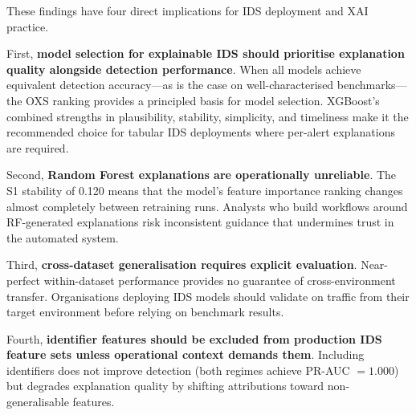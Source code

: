 \documentclass[12pt,a4paper]{report}
\begin{document}
These findings have four direct implications for IDS deployment and XAI practice.

First, \textbf{model selection for explainable IDS should prioritise explanation quality alongside detection performance}. When all models achieve equivalent detection accuracy---as is the case on well-characterised benchmarks---the OXS ranking provides a principled basis for model selection. XGBoost's combined strengths in plausibility, stability, simplicity, and timeliness make it the recommended choice for tabular IDS deployments where per-alert explanations are required.

Second, \textbf{Random Forest explanations are operationally unreliable}. The S1 stability of 0.120 means that the model's feature importance ranking changes almost completely between retraining runs. Analysts who build workflows around RF-generated explanations risk inconsistent guidance that undermines trust in the automated system.

Third, \textbf{cross-dataset generalisation requires explicit evaluation}. Near-perfect within-dataset performance provides no guarantee of cross-environment transfer. Organisations deploying IDS models should validate on traffic from their target environment before relying on benchmark results.

Fourth, \textbf{identifier features should be excluded from production IDS feature sets unless operational context demands them}. Including identifiers does not improve detection (both regimes achieve PR-AUC $= 1.000$) but degrades explanation quality by shifting attributions toward non-generalisable features.

\begin{center}
\end{center}
\end{document}
